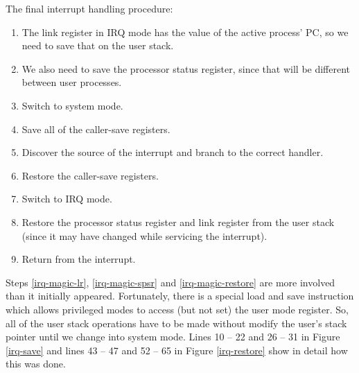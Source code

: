 \documentclass[12pt]{article}
\begin{document}
\pagebreak

\noindent
The final interrupt handling procedure:
\begin{enumerate}
\item \label{irq-magic-lr}The link register in IRQ mode has the value of the
    active process' PC, so we need to save that on the user stack.
\item \label{irq-magic-spsr}We also need to save the processor status register,
    since that will be different between user processes. 
\item Switch to system mode.
\item Save all of the caller-save registers.
\item Discover the source of the interrupt and branch to the correct handler.
\item Restore the caller-save registers.
\item Switch to IRQ mode.
\item \label{irq-magic-restore}Restore the processor status register and link
    register from the user stack (since it may have changed while servicing the
    interrupt).
\item Return from the interrupt.
\end{enumerate}

Steps \ref{irq-magic-lr}, \ref{irq-magic-spsr} and \ref{irq-magic-restore}
are more involved than it initially appeared. Fortunately, there is a special
load and save instruction which allows privileged modes to access (but not set)
the user mode register. So, all of the user stack operations have to be made
without modify the user's stack pointer until we change into system mode. Lines
10 \--- 22 and 26 \--- 31 in Figure \ref{irq-save} and lines 43 \--- 47 and 52
\--- 65 in Figure \ref{irq-restore} show in detail how this was done.
\end{document}

